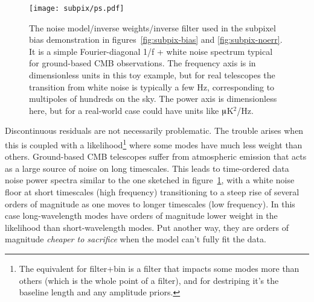 \documentclass{aa}
\begin{document}
\begin{figure}
	\centering
	\hspace*{-2mm}\texttt{[image: subpix/ps.pdf]}
	\caption{
		The noise model/inverse weights/inverse filter used in the subpixel
		bias demonstration in figures~\ref{fig:subpix-bias} and \ref{fig:subpix-noerr}.
		It is a simple Fourier-diagonal 1/f + white noise spectrum
		typical for ground-based CMB observations. The frequency axis is in
		dimensionless units in this toy example, but for real telescopes the
		transition from white noise is typically a few Hz, corresponding
		to multipoles of hundreds on the sky. The power axis is dimensionless
		here, but for a real-world case could have units like $\micro$K$^2$/Hz.
	}
	\label{fig:ps}
\end{figure}

Discontinuous residuals are not necessarily problematic. The trouble arises
when this is coupled with a likelihood\footnote{The equivalent for filter+bin is a filter that
impacts some modes more than others (which is the whole point of a filter),
and for destriping it's the baseline length and any amplitude priors.
} where some modes have much less weight than others. Ground-based CMB
telescopes suffer from atmospheric emission that acts as a large source
of noise on long timescales. This leads to time-ordered data noise power
spectra similar to the one sketched in figure~\ref{fig:ps}, with
a white noise floor at short timescales (high frequency) transitioning to a steep
rise of several orders of magnitude as one moves to longer timescales
(low frequency). In this case long-wavelength modes have orders of magnitude
lower weight in the likelihood than short-wavelength modes. Put another way,
they are orders of magnitude \emph{cheaper to sacrifice} when the model can't fully
fit the data.
\end{document}
